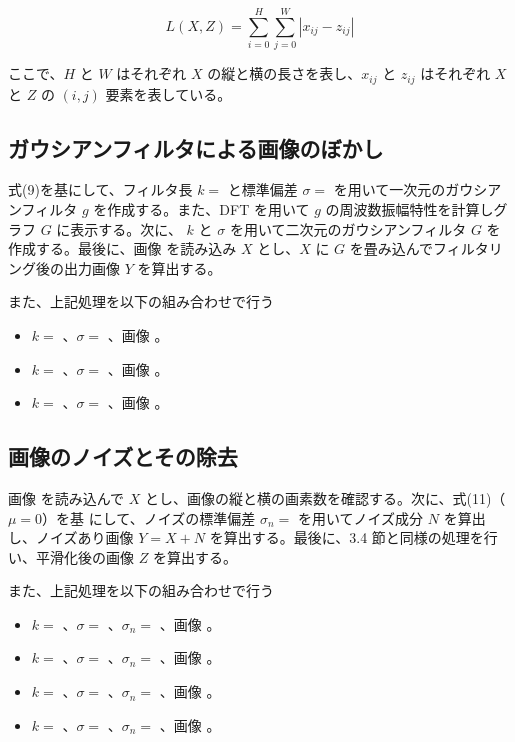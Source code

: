 \documentclass[dvipdfmx]{jsarticle}
\begin{document}
\begin{equation}
L(X,Z)
=
\sum_{i=0}^{H}
\sum_{j=0}^{W}
|x_{ij}-z_{ij}|
\tag{13}
\end{equation}

ここで、$H$ と $W$ はそれぞれ $X$ の縦と横の長さを表し、$x_{ij}$ と $z_{ij}$ はそれぞれ $X$ と
$Z$ の $(i,j)$ 要素を表している。

\subsection{ガウシアンフィルタによる画像のぼかし}

式(9)を基にして、フィルタ長 $k =$ と標準偏差 $\sigma =$ を用いて一次元のガウシアンフィルタ
$g$ を作成する。また、DFT を用いて $g$ の周波数振幅特性を計算しグラフ $G$ に表示する。次に、
$k$ と $\sigma$ を用いて二次元のガウシアンフィルタ $G$ を作成する。最後に、画像 を読み込み $X$
とし、$X$ に $G$ を畳み込んでフィルタリング後の出力画像 $Y$ を算出する。

また、上記処理を以下の組み合わせで行う

\begin{itemize}
\item $k =$ 、$\sigma =$ 、画像 。
\item $k =$ 、$\sigma =$ 、画像 。
\item $k =$ 、$\sigma =$ 、画像 。
\end{itemize}

\subsection{画像のノイズとその除去}

画像 を読み込んで $X$ とし、画像の縦と横の画素数を確認する。次に、式(11)（$\mu=0$）を基
にして、ノイズの標準偏差 $\sigma_n =$ を用いてノイズ成分 $N$ を算出し、ノイズあり画像
$Y=X+N$ を算出する。最後に、3.4 節と同様の処理を行い、平滑化後の画像 $Z$ を算出する。

また、上記処理を以下の組み合わせで行う

\begin{itemize}
\item $k =$ 、$\sigma =$ 、$\sigma_n =$ 、画像 。
\item $k =$ 、$\sigma =$ 、$\sigma_n =$ 、画像 。
\item $k =$ 、$\sigma =$ 、$\sigma_n =$ 、画像 。
\item $k =$ 、$\sigma =$ 、$\sigma_n =$ 、画像 。
\end{itemize}
\end{document}
